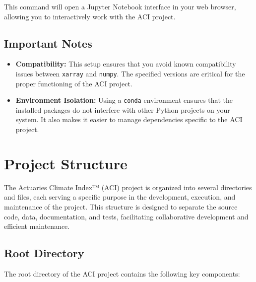 \documentclass[a4paper,12pt]{article}
\begin{document}
This command will open a Jupyter Notebook interface in your web browser, allowing you to interactively work with the ACI project.

\subsection{Important Notes}
\begin{itemize}
    \item \textbf{Compatibility:} This setup ensures that you avoid known compatibility issues between \texttt{xarray} and \texttt{numpy}. The specified versions are critical for the proper functioning of the ACI project.
    \item \textbf{Environment Isolation:} Using a \texttt{conda} environment ensures that the installed packages do not interfere with other Python projects on your system. It also makes it easier to manage dependencies specific to the ACI project.
\end{itemize}

\section{Project Structure}
\label{sec:structure}

The Actuaries Climate Index™ (ACI) project is organized into several directories and files, each serving a specific purpose in the development, execution, and maintenance of the project. This structure is designed to separate the source code, data, documentation, and tests, facilitating collaborative development and efficient maintenance.

\subsection{Root Directory}

The root directory of the ACI project contains the following key components:
\end{document}
